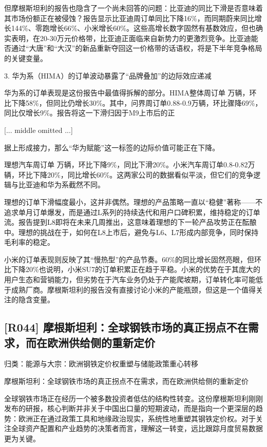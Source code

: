 \documentclass[11pt]{ctexart}
\begin{document}
但摩根斯坦利的报告也隐含了一个尚未回答的问题：比亚迪的同比下滑是否意味着其市场份额正在被侵蚀？报告显示比亚迪周订单同比下降16\%，而同期蔚来同比增长144\%、零跑增长66\%、小米增长60\%。这些高增长数字固然有基数效应，但也确实表明，在20-30万元价格带，比亚迪正面临来自新势力的更激烈竞争。比亚迪能否通过“大唐”和“大汉”的新品重新夺回这一价格带的话语权，将是下半年竞争格局的关键变量。

3. 华为系（HIMA）的订单波动暴露了“品牌叠加”的边际效应递减

华为系的订单表现是这份报告中最值得拆解的部分。HIMA整体周订单 万辆，环比下降58\%，但同比仍增长30\%。其中，问界周订单0.88-0.9万辆，环比骤降69\%，同比仅增长9\%。报告将这一下滑归因于M9上市后的正

[... middle omitted ...]

据上形成接力，那么“华为赋能”这一标签的边际价值可能正在下降。

理想汽车周订单 万辆，环比下降9\%，同比下滑20\%。小米汽车周订单0.8-0.82万辆，环比下降20\%，同比增长60\%。这两家公司的数据看似平淡，但它们的竞争逻辑与比亚迪和华为系截然不同。

理想的订单下滑幅度最小，这并非偶然。理想的产品策略一直以“稳健”著称——不追求单月订单爆发，而是通过L系列的持续迭代和用户口碑积累，维持稳定的订单流。报告提到L8即将在未来几周推出，这意味着理想的下一轮产品攻势正在酝酿中。理想的挑战在于，如何在L8上市后，避免与L6、L7形成内部竞争，同时保持毛利率的稳定。

小米的订单表现则反映了其“慢热型”的产品节奏。60\%的同比增长固然亮眼，但环比下降20\%也说明，小米SU7的订单积累正在趋于平稳。小米的优势在于其庞大的用户生态和营销能力，但劣势在于汽车业务仍处于产能爬坡期，订单转化率可能低于成熟厂商。摩根斯坦利的报告没有直接讨论小米的产能瓶颈，但这是一个值得关注的隐含变量。

\subsection{[R044] 摩根斯坦利：全球钢铁市场的真正拐点不在需求，而在欧洲供给侧的重新定价}
{\small\color{refgray}归类：能源与大宗：欧洲钢铁定价权重塑与储能政策重心转移}

摩根斯坦利：全球钢铁市场的真正拐点不在需求，而在欧洲供给侧的重新定价

全球钢铁市场正在经历一个被多数投资者低估的结构性转变。这份摩根斯坦利刚刚发布的研报，核心判断并非关于中国出口量的短期波动，而是指向一个更深层的趋势：欧洲正在通过政策工具和地缘政治现实，系统性地重塑其钢铁定价权。对于关注全球资产配置和产业趋势的决策者而言，理解这一转变，远比跟踪月度贸易数据更为关键。
\end{document}
